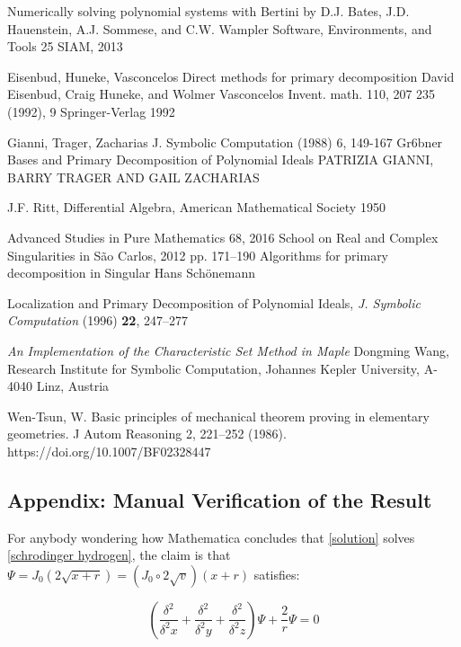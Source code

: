 \documentclass{article}
\begin{document}
\begin{thebibliography}{9}
Numerically solving polynomial systems with Bertini
by D.J. Bates, J.D. Hauenstein, A.J. Sommese, and C.W. Wampler
Software, Environments, and Tools 25
SIAM, 2013

 Eisenbud, Huneke, Vasconcelos
Direct methods for primary decomposition
David Eisenbud, Craig Huneke, and Wolmer Vasconcelos
Invent. math. 110, 207 235 (1992),
9 Springer-Verlag 1992

 Gianni, Trager, Zacharias
J. Symbolic Computation (1988) 6, 149-167
Gr6bner Bases and Primary Decomposition of
Polynomial Ideals
PATRIZIA GIANNI, BARRY TRAGER AND GAIL ZACHARIAS

J.F. Ritt, Differential Algebra, American Mathematical Society 1950

Advanced Studies in Pure Mathematics 68, 2016
School on Real and Complex Singularities in São Carlos, 2012
pp. 171–190
Algorithms for primary decomposition in Singular
Hans Schönemann

 Localization and Primary Decomposition of Polynomial Ideals, {\it J. Symbolic Computation} (1996) {\bf 22}, 247–277

{\it An Implementation of the Characteristic Set Method in Maple}
Dongming Wang,
Research Institute for Symbolic Computation,
Johannes Kepler University, A-4040 Linz, Austria

Wen-Tsun, W. Basic principles of mechanical theorem proving in elementary geometries. J Autom Reasoning 2, 221–252 (1986). https://doi.org/10.1007/BF02328447

\end{thebibliography}

\vfill\eject
\subsection*{Appendix: Manual Verification of the Result}
For anybody wondering how Mathematica concludes that \eqref{solution} solves \eqref{schrodinger hydrogen},
the claim is that $\Psi = J_0(2\sqrt{x+r}) = (J_0 \circ 2\sqrt{v}) (x+r)$ satisfies:

\begin{equation}
\label{claim}
\left(\frac{\delta^2}{\delta^2 x} + \frac{\delta^2}{\delta^2 y} + \frac{\delta^2}{\delta^2 z}\right) \Psi + \frac{2}{r}\Psi = 0
\end{equation}
\end{document}
